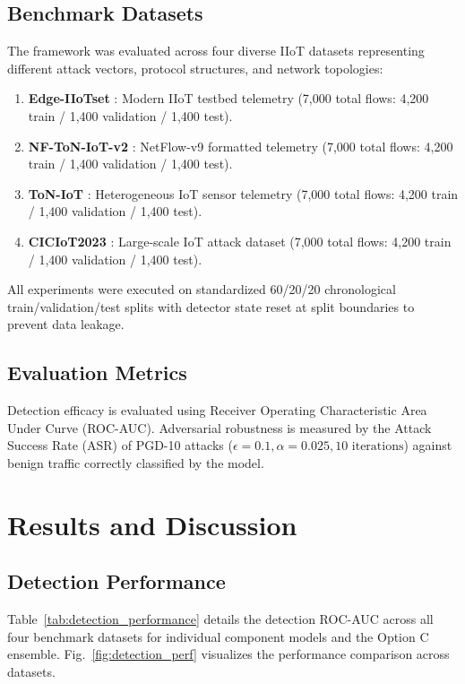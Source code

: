 \documentclass[10pt,journal,compsoc,twocolumn]{IEEEtran}
\begin{document}
\subsection{Benchmark Datasets}
The framework was evaluated across four diverse IIoT datasets representing different attack vectors, protocol structures, and network topologies:
\begin{enumerate}
    \item \textbf{Edge-IIoTset} \cite{edge2024benchmarking}: Modern IIoT testbed telemetry (7,000 total flows: 4,200 train / 1,400 validation / 1,400 test).
    \item \textbf{NF-ToN-IoT-v2} \cite{sarhan2021netflow}: NetFlow-v9 formatted telemetry (7,000 total flows: 4,200 train / 1,400 validation / 1,400 test).
    \item \textbf{ToN-IoT} \cite{moustafa2020toniot}: Heterogeneous IoT sensor telemetry (7,000 total flows: 4,200 train / 1,400 validation / 1,400 test).
    \item \textbf{CICIoT2023} \cite{ciciot2023dataset}: Large-scale IoT attack dataset (7,000 total flows: 4,200 train / 1,400 validation / 1,400 test).
\end{enumerate}

All experiments were executed on standardized 60/20/20 chronological train/validation/test splits with detector state reset at split boundaries to prevent data leakage.

\subsection{Evaluation Metrics}
Detection efficacy is evaluated using Receiver Operating Characteristic Area Under Curve (ROC-AUC). Adversarial robustness is measured by the Attack Success Rate (ASR) of PGD-10 attacks ($\epsilon=0.1, \alpha=0.025, 10 \text{ iterations}$) against benign traffic correctly classified by the model.

\section{Results and Discussion}

\subsection{Detection Performance}
Table~\ref{tab:detection_performance} details the detection ROC-AUC across all four benchmark datasets for individual component models and the Option C ensemble. Fig.~\ref{fig:detection_perf} visualizes the performance comparison across datasets.
\end{document}
